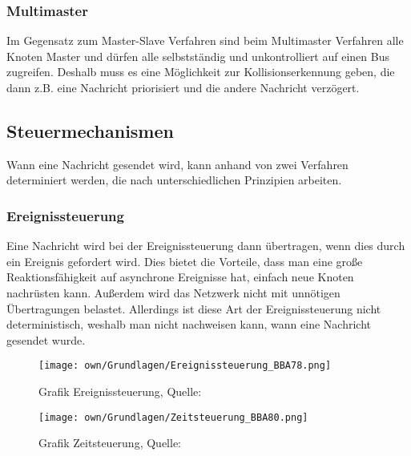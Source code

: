     \subsubsection{Multimaster}
    Im Gegensatz zum Master-Slave Verfahren sind beim Multimaster Verfahren alle Knoten Master und dürfen alle selbstständig und unkontrolliert auf einen Bus zugreifen.
    Deshalb muss es eine Möglichkeit zur Kollisionserkennung geben, die dann z.B. eine Nachricht priorisiert und die andere Nachricht verzögert.

    \subsection{Steuermechanismen}
    Wann eine Nachricht gesendet wird, kann anhand von zwei Verfahren determiniert werden, die nach unterschiedlichen Prinzipien arbeiten.
    
    \subsubsection{Ereignissteuerung}
    Eine Nachricht wird bei der Ereignissteuerung dann übertragen, wenn dies durch ein Ereignis gefordert wird.
    Dies bietet die Vorteile, dass man eine große Reaktionsfähigkeit auf asynchrone Ereignisse hat, einfach neue Knoten nachrüsten kann.
    Außerdem wird das Netzwerk nicht mit unnötigen Übertragungen belastet.
    Allerdings ist diese Art der Ereignissteuerung nicht deterministisch, weshalb man nicht nachweisen kann, wann eine Nachricht gesendet wurde. 
    

    \begin{figure}
        \centering
        \begin{minipage}{.5\textwidth}
          \centering
          \texttt{[image: own/Grundlagen/Ereignissteuerung\_BBA78.png]}
          \caption{Grafik Ereignissteuerung, Quelle: \cite{BAA2011, S.78}}
            \label{fig:Ereignissteuerung}
        \end{minipage}%
        \begin{minipage}{.5\textwidth}
          \centering
          \texttt{[image: own/Grundlagen/Zeitsteuerung\_BBA80.png]}
          \caption{Grafik Zeitsteuerung, Quelle: \cite{BAA2011, S.80}}
        \label{fig:Zeitsteuerung}
        \end{minipage}
        \end{figure}




